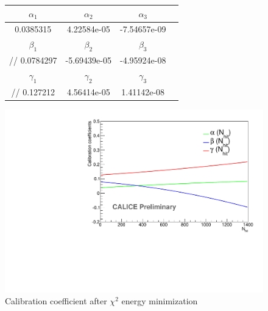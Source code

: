 \documentclass[cits]{JINST}
\begin{document}
\begin{center}
  \begin{figure}
    \begin{minipage}{0.48\textwidth}
      \begin{tabular}{| c | c | c | c |}
        \hline
        $\alpha_1$   &   $\alpha_2$    &   $\alpha_3$   \\ \hline
        0.0385315    &   4.22584e-05   &   -7.54657e-09 \\ \hline \hline
        $\beta_1$    &   $\beta_2$     &   $\beta_3$   \\ \hline
        // 0.0784297 &  -5.69439e-05   &   -4.95924e-08 \\ \hline \hline
        $\gamma_1$   &   $\gamma_2$    &   $\gamma_3$   \\ \hline
        // 0.127212  &   4.56414e-05   &   1.41142e-08  \\ \hline
      \end{tabular}    
    \end{minipage}  \hfill
    \begin{minipage}{0.5\textwidth}
        \includegraphics[width=\linewidth]{plots/EnergyCalibration.pdf}      
    \end{minipage}
    \caption{\label{SDHCAL_CALIBRATION} Calibration coefficient after $\chi^2$ energy minimization}
  \end{figure}
\end{center}
\end{document}
